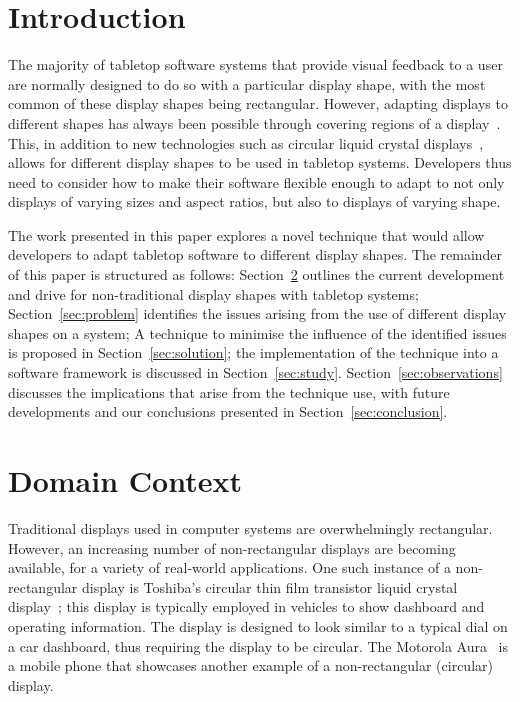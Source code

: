 \documentclass[review,5p,times,twocolumn]{elsarticle}
\begin{document}
\section{Introduction}
\label{sec:intro}

The majority of tabletop software systems that provide visual feedback to a user are normally designed to do so with a particular display shape, with the most common of these display shapes being rectangular.
However, adapting displays to different shapes has always been possible through covering regions of a display~\cite{Dietz2004}.
This, in addition to new technologies such as circular liquid crystal displays~\cite{Boyd2007,Finney2009}, allows for different display shapes to be used in tabletop systems. 
Developers thus need to consider how to make their software flexible enough to adapt to not only displays of varying sizes and aspect ratios, but also to displays of varying shape.

The work presented in this paper explores a novel technique that would allow developers to adapt tabletop software to different display shapes.
The remainder of this paper is structured as follows: 
Section~\ref{sec:related} outlines the current development and drive for non-traditional display shapes with tabletop systems;
Section~\ref{sec:problem} identifies the issues arising from the use of different display shapes on a system;
A technique to minimise the influence of the identified issues is proposed in Section~\ref{sec:solution};
the implementation of the technique into a software framework is discussed in Section~\ref{sec:study}.
Section~\ref{sec:observations} discusses the implications that arise
from the technique use, with future developments and our conclusions presented in Section~\ref{sec:conclusion}.

\section{Domain Context}
\label{sec:related}

Traditional displays used in computer systems are overwhelmingly rectangular.
However, an increasing number of non-rectangular displays are becoming available, for a variety of real-world applications.
One such instance of a non-rectangular display is Toshiba's circular
thin film transistor liquid crystal display~\cite{Boyd2007}; this display is typically employed in vehicles to show dashboard and operating information.
The display is designed to look similar to a typical dial on a car dashboard, thus requiring the display to be circular.
The Motorola Aura~\cite{Finney2009} is a mobile phone that showcases another example of a non-rectangular (circular) display.
\end{document}
